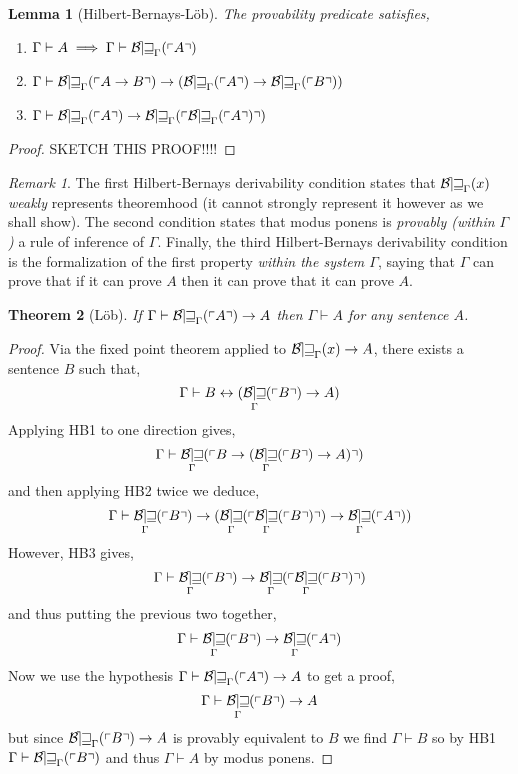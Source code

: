 \documentclass[12pt, leqno]{article}
\newcommand{\proves}{\vdash}
\theoremstyle{theorem}
\newtheorem{theorem}{Theorem}[section]
\newtheorem{lemma}[theorem]{Lemma}
\theoremstyle{definition}
\theoremstyle{definition}
\theoremstyle{remark}
\theoremstyle{definition}
\theoremstyle{remark}
\newtheorem{remark}{Remark}[subsection]
\DeclareMathOperator{\Bew}{\mathcal{B\mkern-2.0mu e\mkern-2.0mu w\mkern-1mu}}
\newcommand{\Gterm}[1]{\left\ulcorner #1 \right\urcorner}
\newcommand{\Thm}[1]{\Bew_{\Gamma}(\Gterm{#1})}
\begin{document}
\begin{lemma}[Hilbert-Bernays-L\"{o}b]
The provability predicate satisfies,
\begin{enumerate}
\item $\Gamma \proves A \implies \Gamma \proves \Thm{A}$ 
\item $\Gamma \proves \Thm{A \to B} \to (\Thm{A} \to \Thm{B})$
\item $\Gamma \proves \Thm{A} \to \Thm{\Thm{A}}$
\end{enumerate}
\end{lemma}

\begin{proof}
SKETCH THIS PROOF!!!!
\end{proof}

\begin{remark}
The first Hilbert-Bernays derivability condition states that $\Bew_{\Gamma}(x)$ \textit{weakly} represents theoremhood (it cannot strongly represent it however as we shall show). The second condition states that modus ponens is \textit{provably (within $\Gamma$)} a rule of inference of $\Gamma$. Finally, the third Hilbert-Bernays derivability condition is the formalization of the first property \textit{within the system $\Gamma$}, saying that $\Gamma$ can prove that if it can prove $A$ then it can prove that it can prove $A$.  
\end{remark}

\begin{theorem}[L\"{o}b]
If $\Gamma \proves \Thm{A} \to A$ then $\Gamma \proves A$ for any sentence $A$.
\end{theorem}

\begin{proof}
Via the fixed point theorem applied to $\Bew_{\Gamma}(x) \to A$, there exists a sentence $B$ such that,
\[ \Gamma \proves B \leftrightarrow (\Thm{B} \to A) \]
Applying HB1 to one direction gives,
\[ \Gamma \proves \Thm{B \to (\Thm{B} \to A)} \]
and then applying HB2 twice we deduce,
\[ \Gamma \proves \Thm{B} \to (\Thm{\Thm{B}} \to \Thm{A}) \]
However, HB3 gives, 
\[ \Gamma \proves \Thm{B} \to \Thm{\Thm{B}} \]
and thus putting the previous two together,
\[ \Gamma \proves \Thm{B} \to \Thm{A} \]
Now we use the hypothesis $\Gamma \proves \Thm{A} \to A$ to get a proof,
\[ \Gamma \proves \Thm{B} \to A \]
but since $\Thm{B} \to A$ is provably equivalent to $B$ we find $\Gamma \proves B$ so by HB1 $\Gamma \proves \Thm{B}$ and thus $\Gamma \proves A$ by modus ponens. 
\end{proof}
\end{document}
